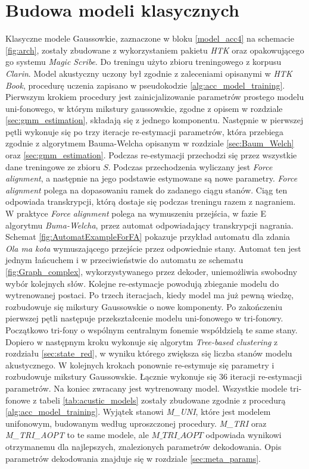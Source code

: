 \documentclass[shortabstract, mgr]{iithesis}
\newcommand{\refBlock}[1]{
	\hyperref[#1]{\ref*{#1}}
}
\begin{document}
	\section{Budowa modeli klasycznych}
		Klasyczne modele Gaussowkie, zaznaczone w bloku \refBlock{model_acc4} na schemacie \ref{fig:arch}, zostały zbudowane z wykorzystaniem pakietu \textit{HTK} oraz opakowującego go systemu \textit{Magic Scribe}. Do treningu użyto zbioru treningowego z korpusu \textit{Clarin}. Model akustyczny uczony był zgodnie z zaleceniami opisanymi w \textit{HTK Book}\cite{htkbook}, procedurę uczenia zapisano w pseudokodzie \ref{alg:acc_model_training}. Pierwszym krokiem procedury jest zainicjalizowanie parametrów prostego modelu uni-fonowego, w którym mikstury gaussowskie, zgodne z opisem w rozdziale \ref{sec:gmm_estimation}, składają się z jednego komponentu. Następnie w pierwszej pętli wykonuje się po trzy iteracje re-estymacji parametrów, która przebiega zgodnie z algorytmem Bauma-Welcha opisanym w rozdziale \ref{sec:Baum_Welch} oraz \ref{sec:gmm_estimation}. Podczas re-estymacji przechodzi się przez wszystkie dane treningowe ze zbioru $S$. Podczas przechodzenia wyliczany jest \textit{Force alignment}, a następnie na jego podstawie estymowane są nowe parametry. \textit{Force alignment} polega na dopasowaniu ramek do zadanego ciągu stanów. Ciąg ten odpowiada transkrypcji, którą dostaje się podczas treningu razem z nagraniem. W praktyce \textit{Force alignment} polega na wymuszeniu przejścia, w fazie E algorytmu \textit{Buma-Welcha}, przez automat odpowiadający transkrypcji nagrania. Schemat \ref{fig:AutomatExampleForFA} pokazuje przykład automatu dla zdania \textit{Ola ma kota} wymuszającego przejście przez odpowiednie stany. Automat ten jest jednym łańcuchem i w przeciwieństwie do automatu ze schematu \ref{fig:Graph_complex}, wykorzystywanego przez dekoder, uniemożliwia swobodny wybór kolejnych słów. Kolejne re-estymacje powodują zbieganie modelu do wytrenowanej postaci. Po trzech iteracjach, kiedy model ma już pewną wiedzę, rozbudowuje się mikstury Gaussowskie o nowe komponenty. Po zakończeniu pierwszej pętli następuje przekształcenie modelu uni-fonowego w tri-fonowy. Początkowo tri-fony o wspólnym centralnym fonemie współdzielą te same stany. Dopiero w następnym kroku wykonuje się algorytm \textit{Tree-based clustering} z rozdziału \ref{sec:state_red}, w wyniku którego zwiększa się liczba stanów modelu akustycznego. W kolejnych krokach ponownie re-estymuje się parametry i rozbudowuje mikstury Gaussowskie. Łącznie wykonuje się $36$ iteracji re-estymacji parametrów. Na koniec zwracany jest wytrenowany model. Wszystkie modele tri-fonowe z tabeli \ref{tab:acustic_models} zostały zbudowane zgodnie z procedurą \ref{alg:acc_model_training}. Wyjątek stanowi \textit{M\_UNI}, które jest modelem unifonowym, budowanym według uproszczonej procedury. \textit{M\_TRI} oraz \textit{M\_TRI\_AOPT} to te same modele, ale $M\_TRI\_AOPT$ odpowiada wynikowi otrzymanemu dla najlepszych, znalezionych parametrów dekodowania. Opis parametrów dekodowania znajduje się w rozdziale \ref{sec:meta_params}.
		
\end{document}
